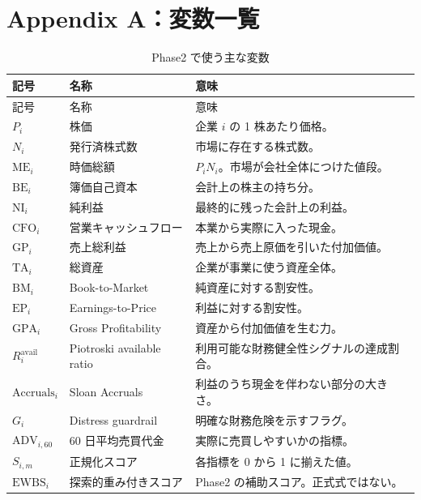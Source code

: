 \documentclass[a4paper,10pt]{article}
\newcommand{\metric}[1]{\mathrm{#1}}
\begin{document}
\section{Appendix A：変数一覧}
\begin{longtable}{p{26mm}p{40mm}p{78mm}}
\caption{Phase2 で使う主な変数}\\
\toprule
記号 & 名称 & 意味 \\
\midrule
\endfirsthead
\toprule
記号 & 名称 & 意味 \\
\midrule
\endhead
$P_i$ & 株価 & 企業 $i$ の 1 株あたり価格。 \\
$N_i$ & 発行済株式数 & 市場に存在する株式数。 \\
$\metric{ME}_i$ & 時価総額 & $P_iN_i$。市場が会社全体につけた値段。 \\
$\metric{BE}_i$ & 簿価自己資本 & 会計上の株主の持ち分。 \\
$\metric{NI}_i$ & 純利益 & 最終的に残った会計上の利益。 \\
$\metric{CFO}_i$ & 営業キャッシュフロー & 本業から実際に入った現金。 \\
$\metric{GP}_i$ & 売上総利益 & 売上から売上原価を引いた付加価値。 \\
$\metric{TA}_i$ & 総資産 & 企業が事業に使う資産全体。 \\
$\metric{BM}_i$ & Book-to-Market & 純資産に対する割安性。 \\
$\metric{EP}_i$ & Earnings-to-Price & 利益に対する割安性。 \\
$\metric{GPA}_i$ & Gross Profitability & 資産から付加価値を生む力。 \\
$R^{\mathrm{avail}}_i$ & Piotroski available ratio & 利用可能な財務健全性シグナルの達成割合。 \\
$\metric{Accruals}_i$ & Sloan Accruals & 利益のうち現金を伴わない部分の大きさ。 \\
$G_i$ & Distress guardrail & 明確な財務危険を示すフラグ。 \\
$\metric{ADV}_{i,60}$ & 60 日平均売買代金 & 実際に売買しやすいかの指標。 \\
$S_{i,m}$ & 正規化スコア & 各指標を 0 から 1 に揃えた値。 \\
$\metric{EWBS}_i$ & 探索的重み付きスコア & Phase2 の補助スコア。正式式ではない。 \\
\bottomrule
\end{longtable}
\end{document}

